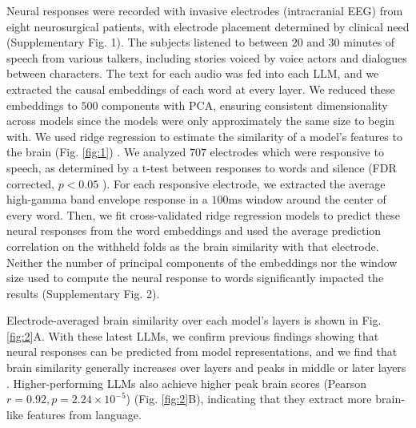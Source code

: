 Neural responses were recorded with invasive electrodes (intracranial EEG) from eight neurosurgical patients, with electrode placement determined by clinical need (Supplementary Fig. 1). The subjects listened to between $20$ and $30$ minutes of speech from various talkers, including stories voiced by voice actors and dialogues between characters. The text for each audio was fed into each LLM, and we extracted the causal embeddings of each word at every layer. We reduced these embeddings to $500$ components with PCA, ensuring consistent dimensionality across models since the models were only approximately the same size to begin with. We used ridge regression to estimate the similarity of a model’s features to the brain (Fig. \ref{fig:1}) \cite{goldstein2022shared, schrimpf2021neural, caucheteux2022brains}. We analyzed $707$ electrodes which were responsive to speech, as determined by a t-test between responses to words and silence (FDR corrected, $p<0.05$ \cite{holm1979simple}). For each responsive electrode, we extracted the average high-gamma band envelope response in a $100$ms window around the center of every word. Then, we fit cross-validated ridge regression models to predict these neural responses from the word embeddings and used the average prediction correlation on the withheld folds as the brain similarity with that electrode. Neither the number of principal components of the embeddings nor the window size used to compute the neural response to words significantly impacted the results (Supplementary Fig. 2).


Electrode-averaged brain similarity over each model's layers is shown in Fig. \ref{fig:2}A. With these latest LLMs, we confirm previous findings showing that neural responses can be predicted from model representations, and we find that brain similarity generally increases over layers and peaks in middle or later layers \cite{schrimpf2021neural, caucheteux2022brains}. Higher-performing LLMs also achieve higher peak brain scores (Pearson $r=0.92, p=2.24\times10^{-5}$) (Fig. \ref{fig:2}B), indicating that they extract more brain-like features from language.

